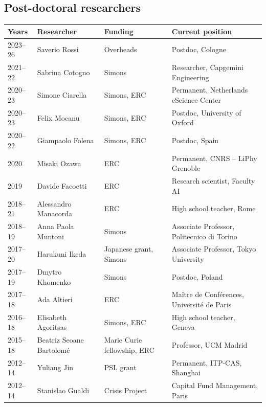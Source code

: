 \documentclass[a4paper,10pt]{article}
\begin{document}
\subsection{Post-doctoral researchers}
\vspace{4pt}
{\small
\begin{tabularx}{\textwidth}{@{}>{\hspace{0pt}\color{datecol}}p{} p{} p{} >{\raggedright\arraybackslash}X@{}}
\textbf{Years} & \textbf{Researcher} & \textbf{Funding} & \textbf{Current position} \\[1pt]
\hline
2023--26 & Saverio Rossi & Overheads & Postdoc, Cologne \\
2021--22 & Sabrina Cotogno & Simons & Researcher, Capgemini Engineering \\
2020--23 & Simone Ciarella & Simons, ERC & Permanent, Netherlands eScience Center \\
2020--23 & Felix Mocanu & Simons, ERC & Postdoc, University of Oxford \\
2020--22 & Giampaolo Folena & Simons, ERC & Postdoc, Spain \\
2020 & Misaki Ozawa & ERC & Permanent, CNRS -- LiPhy Grenoble \\
2019 & Davide Facoetti & ERC & Research scientist, Faculty AI \\
2018--21 & Alessandro Manacorda & ERC & High school teacher, Rome \\
2018--19 & Anna Paola Muntoni & Simons & Associate Professor, Politecnico di Torino \\
2017--20 & Harukuni Ikeda & Japanese grant, Simons & Associate Professor, Tokyo University \\
2017--19 & Dmytro Khomenko & Simons & Postdoc, Poland \\
2017--18 & Ada Altieri & ERC & Maître de Conférences, Université de Paris \\
2016--18 & Elisabeth Agoritsas & Simons, ERC & High school teacher, Geneva \\
2015--18 & Beatriz Seoane Bartolomé & Marie Curie fellowship, ERC & Professor, UCM Madrid \\
2012--14 & Yuliang Jin & PSL grant & Permanent, ITP-CAS, Shanghai \\
2012--14 & Stanislao Gualdi & Crisis Project & Capital Fund Management, Paris \\
\hline
\end{tabularx}}
\end{document}
